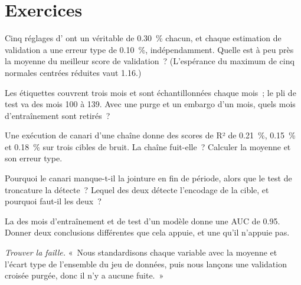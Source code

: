 \section{Exercices}

\begin{exercise}[$\star$]\label{exo:ml:validation:1}
Cinq réglages d' ont un  véritable de 0.30~\% chacun, et chaque estimation de validation a
une erreur type de 0.10~\%, indépendamment. Quelle est à peu près la moyenne du meilleur score de validation~? (L'espérance du maximum de
cinq normales centrées réduites vaut 1.16.)
\end{exercise}

\begin{exercise}[$\star$]\label{exo:ml:validation:2}
Les étiquettes couvrent trois mois et sont échantillonnées chaque mois~; le pli de test va des mois 100 à 139. Avec une purge et un
embargo d'un mois, quels mois d'entraînement sont retirés~?
\end{exercise}

\begin{exercise}[$\star$]\label{exo:ml:validation:3}
Une exécution de canari d'une chaîne donne des scores de R² de 0.21~\%, 0.15~\% et 0.18~\% sur trois cibles de bruit. La chaîne
fuit-elle~? Calculer la moyenne et son erreur type.
\end{exercise}

\begin{exercise}[$\star\star$]\label{exo:ml:validation:4}
Pourquoi le canari manque-t-il la jointure en fin de période, alors que le test de troncature la détecte~? Lequel des deux détecte
l'encodage de la cible, et pourquoi faut-il les deux~?
\end{exercise}

\begin{exercise}[$\star\star$]\label{exo:ml:validation:5}
La  des mois d'entraînement et de test d'un modèle donne une AUC de 0.95. Donner deux conclusions différentes que cela
appuie, et une qu'il n'appuie pas.
\end{exercise}

\begin{exercise}[$\star\star$]\label{exo:ml:validation:6}
\emph{Trouver la faille.} «~Nous standardisons chaque variable avec la moyenne et l'écart type de l'ensemble du jeu de données, puis nous
lançons une validation croisée purgée, donc il n'y a aucune fuite.~»
\end{exercise}

